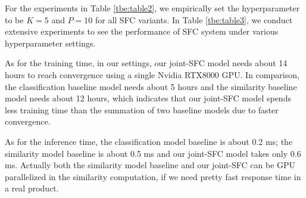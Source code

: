 For  the  experiments  in  Table  \ref{tbe:table2},  we  empirically  set  the
hyperparameter  to  be  $K=5$  and  $P=10$  for  all  SFC  variants.  In Table
\ref{tbe:table3},  we  conduct extensive experiments to see the performance of
SFC system under various hyperparameter settings.

As for the training time, in our settings, our joint-SFC model needs about 14
hours to reach convergence using a single Nvidia RTX8000 GPU. In comparison, the classification baseline model needs about 5 hours and the similarity baseline model
needs about 12 hours, which indicates that our joint-SFC model spends less training
time than the summation of two baseline models due to faster convergence. 

As for the inference time, the classification model baseline is about 0.2 ms;
the similarity model baseline is about 0.5 ms and our joint-SFC model takes only 0.6 ms.
Actually both the similarity model baseline and our joint-SFC can be GPU
parallelized in the similarity computation, if we need pretty fast response time
in a real product.

